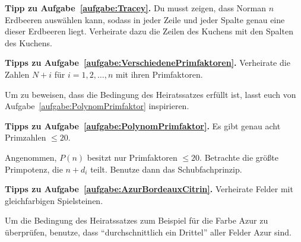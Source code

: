 \textbf{Tipp zu Aufgabe~\ref{aufgabe:Tracey}.} Du musst zeigen, dass Norman $n$ Erdbeeren auswählen kann, sodass in jeder Zeile und jeder Spalte genau eine dieser Erdbeeren liegt. Verheirate dazu die Zeilen des Kuchens mit den Spalten des Kuchens.

\textbf{Tipps zu Aufgabe~\ref{aufgabe:VerschiedenePrimfaktoren}.} Verheirate die Zahlen $N+i$ für $i=1,2,\dotsc,n$ mit ihren Primfaktoren.

Um zu beweisen, dass die Bedingung des Heiratssatzes erfüllt ist, lasst euch von Aufgabe~\ref{aufgabe:PolynomPrimfaktor} inspirieren.

\textbf{Tipps zu Aufgabe~\ref{aufgabe:PolynomPrimfaktor}.} Es gibt genau acht Primzahlen $\leqslant 20$.

Angenommen, $P(n)$ besitzt nur Primfaktoren $\leqslant 20$. Betrachte die größte Primpotenz, die $n+d_i$ teilt. Benutze dann das Schubfachprinzip.

\textbf{Tipps zu Aufgabe~\ref{aufgabe:AzurBordeauxCitrin}.} Verheirate Felder mit gleichfarbigen Spielsteinen.

Um die Bedingung des Heiratssatzes zum Beispiel für die Farbe Azur zu überprüfen, benutze, dass \enquote{durchschnittlich ein Drittel} aller Felder Azur sind.